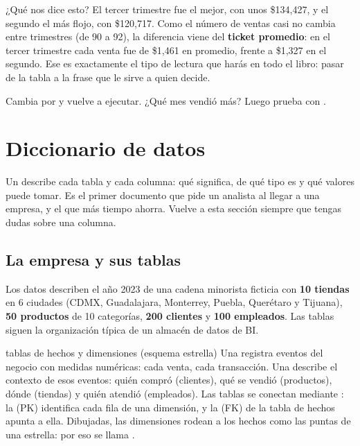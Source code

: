 ¿Qué nos dice esto? El tercer trimestre fue el mejor, con unos \$134,427, y
el segundo el más flojo, con \$120,717. Como el número de ventas casi no
cambia entre trimestres (de 90 a 92), la diferencia viene del
\textbf{ticket promedio}: en el tercer trimestre cada venta fue de \$1,461
en promedio, frente a \$1,327 en el segundo. Ese es exactamente el tipo de
lectura que harás en todo el libro: pasar de la tabla a la frase que le
sirve a quien decide.

\begin{hazlotu}
Cambia  por  y vuelve a
ejecutar. ¿Qué mes vendió más? Luego prueba con
.
\end{hazlotu}

\section{Diccionario de datos}
\label{sec:m0-diccionario}

Un  describe cada tabla y cada columna: qué
significa, de qué tipo es y qué valores puede tomar. Es el primer
documento que pide un analista al llegar a una empresa, y el que más tiempo
ahorra. Vuelve a esta sección siempre que tengas dudas sobre una columna.

\subsection{La empresa y sus tablas}

Los datos describen el año 2023 de una cadena minorista ficticia con
\textbf{10 tiendas} en 6 ciudades (CDMX, Guadalajara, Monterrey, Puebla,
Querétaro y Tijuana), \textbf{50 productos} de 10 categorías,
\textbf{200 clientes} y \textbf{100 empleados}. Las tablas siguen la
organización típica de un almacén de datos de BI.

\begin{concepto}{tablas de hechos y dimensiones (esquema estrella)}
Una  registra eventos del negocio con medidas
numéricas: cada venta, cada transacción. Una 
describe el contexto de esos eventos: quién compró (clientes), qué se
vendió (productos), dónde (tiendas) y quién atendió (empleados). Las tablas
se conectan mediante : la  (PK)
identifica cada fila de una dimensión, y la  (FK) de
la tabla de hechos apunta a ella. Dibujadas, las dimensiones rodean a los
hechos como las puntas de una estrella: por eso se llama
.
\end{concepto}


